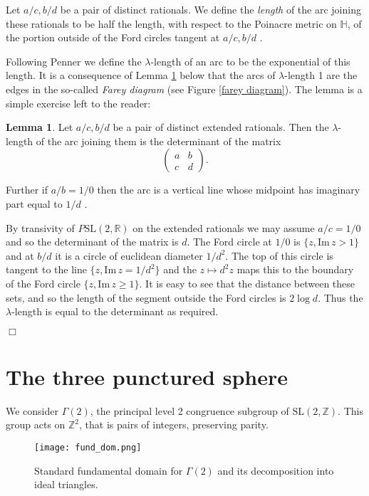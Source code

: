 \documentclass[12pt]{amsart}
\theoremstyle{plain}
\theoremstyle{definition}
\newtheorem{lem}[thm]{Lemma}
\def\HH{\mathbb{H}}
\def\im{\mathrm{Im}\,}
\def\ZZ{\mathbb{Z}}
\def\RR{\mathbb{R}}
\def\sl2{\mathrm{SL}(2, \ZZ)}
\def\slr{\mathrm{SL}(2, \RR)}
\def\g2{\Gamma(2)}
\begin{document}
Let $a/c, b/d$ be a pair of distinct rationals.
We define the \textit{length} of the arc 
joining these rationals 
to be half the length, with respect to the Poinacre metric on $\HH$, 
of the portion  outside of the Ford circles tangent at $a/c, b/d$ .


Following Penner \cite{bob} we define the
$\lambda$-length of an arc to be the exponential of this 
length.
 It is a consequence  of Lemma \ref{calcul} below  that the arcs of $\lambda$-length 1 are the edges in the so-called 
\textit{Farey diagram} (see Figure \ref{farey diagram}).
The lemma  is a simple exercise left to the reader:

\begin{lem}\label{calcul}
Let $a/c, b/d$ be a pair of distinct extended rationals.
Then the  $\lambda$-length of the arc joining them
 is the determinant of the matrix
$$\begin{pmatrix}
a & b \\ c & d
\end{pmatrix}.$$

Further if $a/b = 1/0$ then the arc is a vertical line 
 whose midpoint has imaginary part equal to $1/d$ .
\end{lem}

\proof 
By transivity of $P\slr$ on the extended rationals we may assume 
$a/c = 1/0$ and so the determinant of the matrix is $d$.
The Ford circle at $1/0$  is $\{ z, \im z > 1\}$ and
at $b/d$ it is a circle of euclidean diameter $1/d^2$.
The top of this circle is tangent to the line $\{ z, \im z = 1/d^2\}$
and the $z \mapsto d^2 z $ maps this to the boundary 
of the Ford circle $\{ z, \im z \geq 1\}$.
It is easy to see that the distance between these sets,
and so the length of the segment outside the Ford circles
is $2\log d$. Thus the $\lambda$-length is equal to the 
determinant as required.

\hfill $\Box$

\section{The three punctured sphere}


We consider $\g2$,
the principal level 2 congruence subgroup of $\sl2$.
This group acts on $\ZZ^2$, that is pairs of integers,  preserving parity.

 \begin{figure}[hb]
\begin{center}
\texttt{[image: fund\_dom.png]} 
\end{center}
\caption{Standard fundamental domain for $\g2$ and its decomposition into ideal triangles.}
\label{fund}
\end{figure}
\end{document}
